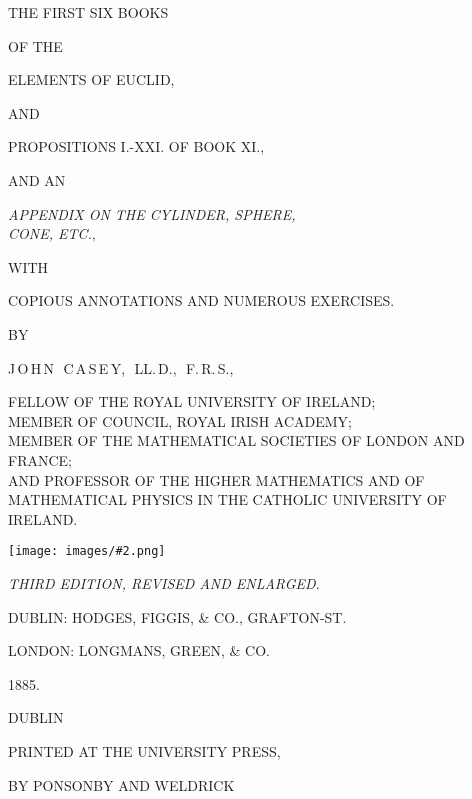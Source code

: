 \documentclass[oneside]{book}
\newcommand\imgcent[2]{
\begin{center}
\texttt{[image: images/\#2.png]}
\end{center}
}
\begin{document}

\newpage
\begin{center}

{\LARGE THE FIRST SIX BOOKS}\bigskip

{\small OF THE}\bigskip

{\Huge ELEMENTS OF EUCLID,}\bigskip

{\small AND}\bigskip

{\Large PROPOSITIONS I.-XXI\@. OF BOOK XI\@.,}\bigskip

{\small AND AN}\bigskip

{\Large \textit{APPENDIX ON THE CYLINDER, SPHERE,\\
CONE, E{\normalsize TC.}},}\bigskip

{\small WITH}\bigskip

COPIOUS ANNOTATIONS AND NUMEROUS EXERCISES.\bigskip

{\small BY}\medskip

{\LARGE J\,O\,H\,N\, \,C\,A\,S\,E\,Y,\, \,LL\@.\,D.,\, \,F.\,R.\,S.,}\medskip

{\small FELLOW OF THE ROYAL UNIVERSITY OF IRELAND;\\
MEMBER OF COUNCIL, ROYAL IRISH ACADEMY;\\
MEMBER OF THE MATHEMATICAL SOCIETIES OF LONDON AND FRANCE;\\
AND PROFESSOR OF THE HIGHER MATHEMATICS AND OF\\
MATHEMATICAL PHYSICS IN THE CATHOLIC UNIVERSITY OF IRELAND.}\bigskip

\imgcent{144}{f000}

\bigskip

\textit{THIRD EDITION, REVISED AND ENLARGED.}\smallskip

DUBLIN: HODGES, FIGGIS, \& CO., GRAFTON-ST.

LONDON: LONGMANS, GREEN, \& CO.

1885.

\end{center}


\newpage

\begin{center}
DUBLIN\medskip

PRINTED AT THE UNIVERSITY PRESS,\medskip

BY PONSONBY AND WELDRICK
\end{center}


\newpage
\frontmatter
\pagestyle{plain}
\end{document}
